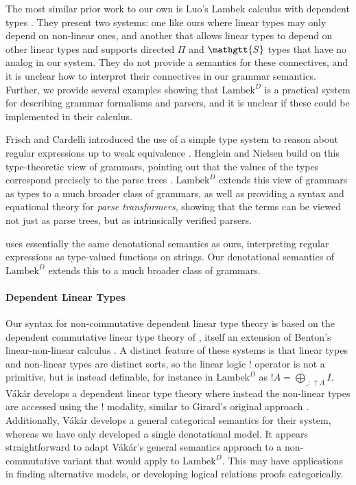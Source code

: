 \documentclass[acmsmall,nonacm]{acmart}
\renewcommand{\Sigma}{\mathgtt{S}}
\newcommand{\theoryabbv}{$\textrm{Lambek}^D$\xspace}
\newcommand{\ltonl}[1]{~\uparrow #1}
\newcommand{\LinSigTy}[3]{\textstyle\bigoplus_{#1 : #2} #3}
\begin{document}
{The most similar prior work to our own is Luo's Lambek calculus with
dependent types \cite{luo}. They present two systems: one like ours where linear
types may only depend on non-linear ones, and another that
allows linear types to depend on other linear types and supports
directed $\Pi$ and $\Sigma$ types that have no analog in our
system. They do not provide a semantics for these connectives, and it
is unclear how to interpret their connectives in our grammar
semantics. Further, we provide several examples showing that
\theoryabbv is a practical system for describing grammar formalisms
and parsers, and it is unclear if these could be implemented in their calculus.

Frisch and Cardelli introduced the use of a simple type system to reason about
regular expressions up to weak equivalence \cite{frischCardelli}.
Henglein and Nielsen build on this type-theoretic view of grammars, pointing out that the values of the types correspond precisely to the parse trees \cite{henglein_regular_2011}.
\theoryabbv extends this view of grammars as types to a much broader class of grammars, as well as providing a syntax and equational theory for \emph{parse transformers}, showing that the terms can be viewed not just as parse trees, but as intrinsically verified parsers.

\citet{elliottSymbolicAutomaticDifferentiation2021} uses essentially the same denotational semantics as ours, interpreting regular expressions as type-valued functions on strings. Our denotational semantics of \theoryabbv extends this to a much broader class of grammars.

\paragraph{Dependent Linear Types}
Our syntax for non-commutative dependent linear type theory is based on the
dependent commutative linear type theory of
\citet{krishnaswami_integrating_2015}, itself an extension of Benton's
linear-non-linear calculus \cite{benton1994}. A distinct feature of these
systems is that linear types and non-linear types are distinct sorts, so the
linear logic $!$ operator is not a primitive, but is instead definable, for
instance in \theoryabbv as $!A = \LinSigTy{\_}{\ltonl A}{I}$.  V\'ak\'ar
develops a dependent linear type theory where instead the non-linear types are
accessed using the $!$ modality, similar to Girard's original approach
\cite{vakar2015,girard_linear_1987}. Additionally, V\'ak\'ar develops a general
categorical semantics for their system, whereas we have only developed a single
denotational model. It appears straightforward to adapt V\'ak\'ar's general
semantics approach to a non-commutative variant that would apply to
\theoryabbv. This may have applications in finding alternative models, or
developing logical relations proofs categorically.

}
\end{document}
